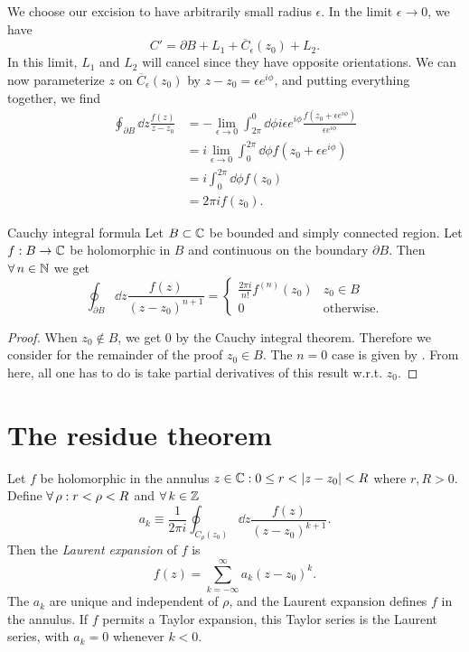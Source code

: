 We choose our excision to have arbitrarily small radius $\epsilon$.
In the limit $\epsilon\to0$, we have
\begin{equation}
  C'=\partial B + L_1 + \overline{C}_{\epsilon}(z_0) + L_2.
\end{equation}
In this limit, $L_1$ and $L_2$ will cancel since they have opposite
orientations.
We can now parameterize $z$ on $\overline{C}_{\epsilon}(z_0)$ 
by $z-z_0=\epsilon e^{i\phi}$, and putting everything together, we find
\begin{equation}\begin{aligned}\label{eq:cauchyn0}
  \oint_{\partial B}\dd{z}\frac{f(z)}{z-z_0}
&=-\lim_{\epsilon\to 0}\int_{2\pi}^0\dd{\phi}
     i\epsilon e^{i\phi}\frac{f(z_0+\epsilon e^{i\phi})}{\epsilon e^{i\phi}}\\
&=i\lim_{\epsilon\to 0}\int_{0}^{2\pi}\dd{\phi}f(z_0+\epsilon e^{i\phi})\\
&=i\int_{0}^{2\pi}\dd{\phi}f(z_0)\\
&=2\pi if(z_0).
\end{aligned}\end{equation}

\begin{theorem}{Cauchy integral formula}{}
Let $B\subset\mathbb{C}$ be bounded and simply connected region. Let $f:B\to\mathbb{C}$ be
holomorphic in $B$ and continuous on the boundary $\partial B$.
Then $\operatorname{\forall} n\in\mathbb{N}$ we get
$$
  \oint_{\partial B}\dd{z}\frac{f(z)}{(z-z_0)^{n+1}}=
\begin{cases}
\frac{2\pi i}{n!}f^{(n)}(z_0) & z_0\in B \\
 0            & \text{otherwise}.
\end{cases}
$$
\begin{proof} When $z_0\notin B$, we get 0 by the Cauchy integral theorem.
Therefore we consider for the remainder of the proof $z_0\in B$.
The $n=0$ case is given by . 
From here, all one has to do is take partial derivatives of this result 
w.r.t. $z_0$.
\end{proof} 
\end{theorem}

\section{The residue theorem}\label{sec:residueThm}

Let $f$ be holomorphic in the annulus ${z\in\C : 0\leq r<|z-z_0|<R}$
where $r,R>0$.
Define $\operatorname{\forall}\rho : r<\rho<R$ and $\operatorname{\forall} k\in\mathbb{Z}$
\begin{equation}\label{eq:laurentCoeff}
  a_k\equiv\frac{1}{2\pi i}\oint_{C_{\rho}(z_0)}\dd{z}\frac{f(z)}{(z-z_0)^{k+1}}.
\end{equation}
Then the {\it Laurent expansion} of $f$ is
\begin{equation}\label{eq:laurentExpansion}
  f(z)=\sum_{k=-\infty}^\infty a_k(z-z_0)^k.
\end{equation}
The $a_k$ are unique and independent of $\rho$, and the Laurent expansion
defines $f$ in the annulus.
If $f$ permits a Taylor expansion, this Taylor series is the Laurent
series, with $a_k=0$ whenever $k<0$.

